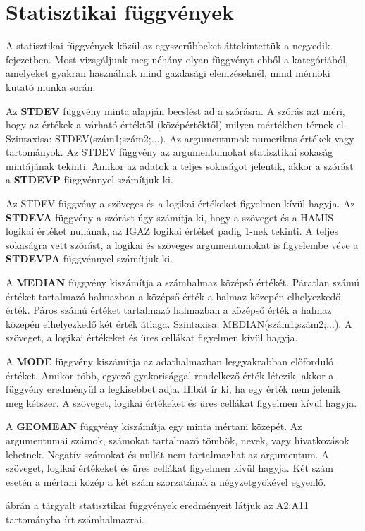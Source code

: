 \section{Statisztikai függvények}

A statisztikai függvények közül az egyszerűbbeket
áttekintettük a negyedik fejezetben. Most vizsgáljunk meg
néhány olyan függvényt ebből a kategóriából,
amelyeket gyakran használnak mind gazdasági elemzéseknél, mind
mérnöki kutató munka során.

Az \textbf{STDEV} függvény minta alapján becslést ad a
szórásra. A szórás azt méri, hogy az értékek a
várható értéktől (középértéktől) milyen
mértékben térnek el. Szintaxisa: STDEV(szám1;szám2;...). Az
argumentumok numerikus értékek vagy tartományok. Az STDEV
függvény az argumentumokat statisztikai sokaság mintájának
tekinti. Amikor az adatok a teljes sokaságot jelentik, akkor a
szórást a \textbf{STDEVP} függvénnyel számítjuk ki. 

Az STDEV függvény a szöveges és a logikai értékeket
figyelmen kívül hagyja. Az \textbf{STDEVA} függvény a
szórást úgy számítja ki, hogy a szöveget és a HAMIS
logikai értéket nullának, az IGAZ logikai értéket padig 1-nek
tekinti. A teljes sokaságra vett szórást, a logikai és
szöveges argumentumokat is figyelembe véve a \textbf{STDEVPA}
függvénnyel számítjuk ki.

A \textbf{MEDIAN} függvény kiszámítja a számhalmaz
középső értékét. Páratlan számú értéket
tartalmazó halmazban a középső érték a halmaz közepén
elhelyezkedő érték. Páros számú értéket tartalmazó
halmazban a középső érték a halmaz közepén
elhelyezkedő két érték átlaga. Szintaxisa:
MEDIAN(szám1;szám2;...). A szöveget, a logikai értékeket és
üres cellákat figyelmen kívül hagyja.

A \textbf{MODE} függvény kiszámítja az adathalmazban
leggyakrabban előforduló értéket. Amikor több, egyező
gyakorisággal rendelkező érték létezik, akkor a
függvény eredményül a legkisebbet adja. Hibát ír ki, ha egy
érték nem jelenik meg kétszer. A szöveget, logikai
értékeket és üres cellákat figyelmen kívül hagyja.

A \textbf{GEOMEAN} függvény kiszámítja egy minta mértani
közepét. Az argumentumai számok, számokat tartalmazó
tömbök, nevek, vagy hivatkozások lehetnek. Negatív számokat
és nullát nem tartalmazhat az argumentum. A szöveget, logikai
értékeket és üres cellákat figyelmen kívül hagyja. Két
szám esetén a mértani közép a két szám szorzatának a
négyzetgyökével egyenlő.

  ábrán a tárgyalt statisztikai függvények
eredményeit látjuk az A2:A11 tartományba írt számhalmazrai.

